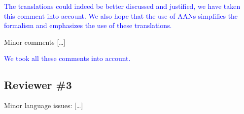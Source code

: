 \documentclass[11pt]{article}
\newcommand{\answer}[1]{\textcolor{blue}{#1}\vspace*{1em}}
\begin{document}
\answer{
The translations could indeed be better discussed and justified,
we have taken this comment into account.
We also hope that the use of AANs simplifies the formalism
and emphasizes the use of these translations.
}

Minor comments […]
% 
% 

\answer{
We took all these comments into account.
}



\subsection*{Reviewer \#3}

Minor language issues: […]

\end{document}
